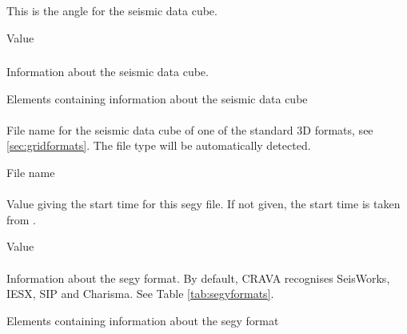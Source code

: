 \subsubsection{\necessary}
 \slist
   \item \Description This is the angle for the seismic data cube.
   \item \Argument Value
   \item \Default
 \elist

\subsubsection{\necessary}
 \slist
   \item \Description Information about the seismic data cube.
   \item \Argument Elements containing information about the seismic data cube
   \item \Default
 \elist

\paragraph{\necessary}
 \slist
   \item \Description File name for the seismic data cube of one of the standard 3D formats, see \autoref{sec:gridformats}. The file
     type will be automatically detected.
   \item \Argument File name
   \item \Default
 \elist

\paragraph{}
 \slist
   \item \Description Value giving the start time for this segy file. If not given, the start time is taken from .
   \item \Argument Value
   \item \Default
 \elist

\paragraph{}
 \slist
   \item \Description Information about the segy format. By default, CRAVA recognises SeisWorks, IESX, SIP and Charisma. See Table \ref{tab:segyformats}.
   \item \Argument Elements containing information about the segy format
   \item \Default
 \elist

